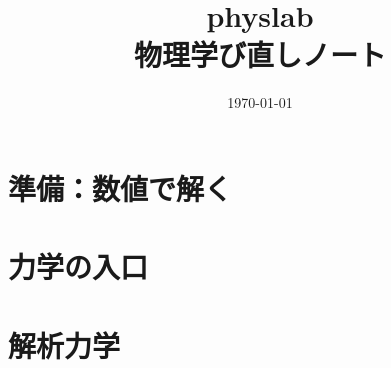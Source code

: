 \documentclass[a4paper,11pt,oneside]{ltjsbook}
\title{physlab\\[0.4em]物理学び直しノート}
\author{}
\date{\today}
\begin{document}
\frontmatter
\maketitle

\tableofcontents

\mainmatter

\part{準備：数値で解く}


\part{力学の入口}


\part{解析力学}




\appendix


\backmatter

\end{document}

